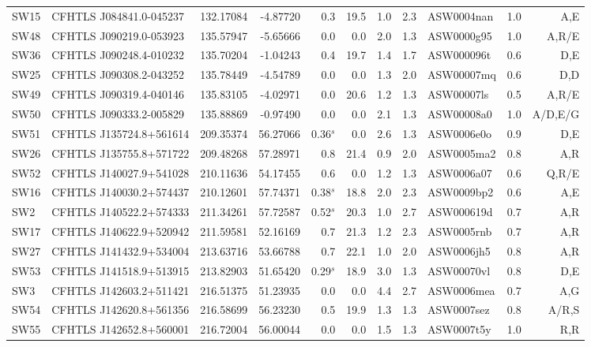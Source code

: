 \documentclass[useAMS,usenatbib,a4paper]{mn2e}
\begin{document}
\begin{center}
\begin{longtable}{llrrrrrrlrr}
SW15 & CFHTLS J084841.0-045237 & 132.17084 &  -4.87720 &  0.3 & 19.5 &  1.0 &  2.3 & ASW0004nan &  1.0 &  A,E   \\ 
SW48 & CFHTLS J090219.0-053923 & 135.57947 &  -5.65666 &  0.0 &  0.0 &  2.0 &  1.3 & ASW0000g95 &  1.0 &  A,R/E   \\ 
SW36 & CFHTLS J090248.4-010232 & 135.70204 &  -1.04243 &  0.4 & 19.7 &  1.4 &  1.7 & ASW000096t &  0.6 &  D,E   \\ 
SW25 & CFHTLS J090308.2-043252 & 135.78449 &  -4.54789 &  0.0 &  0.0 &  1.3 &  2.0 & ASW00007mq &  0.6 &  D,D   \\ 
SW49 & CFHTLS J090319.4-040146 & 135.83105 &  -4.02971 &  0.0 & 20.6 &  1.2 &  1.3 & ASW00007ls &  0.5 &  A,R/E   \\ 
SW50 & CFHTLS J090333.2-005829 & 135.88869 &  -0.97490 &  0.0 &  0.0 &  2.1 &  1.3 & ASW00008a0 &  1.0 &  A/D,E/G   \\ 
SW51 & CFHTLS J135724.8+561614 & 209.35374 &  56.27066 &  0.36$^s$ &  0.0 &  2.6 &  1.3 & ASW0006e0o &  0.9 &  D,E   \\ 
SW26 & CFHTLS J135755.8+571722 & 209.48268 &  57.28971 &  0.8 & 21.4 &  0.9 &  2.0 & ASW0005ma2 &  0.8 &  A,R   \\ 
SW52 & CFHTLS J140027.9+541028 & 210.11636 &  54.17455 &  0.6 &  0.0 &  1.2 &  1.3 & ASW0006a07 &  0.6 &  Q,R/E   \\ 
SW16 & CFHTLS J140030.2+574437 & 210.12601 &  57.74371 &  0.38$^s$ & 18.8 &  2.0 &  2.3 & ASW0009bp2 &  0.6 &  A,E   \\ 
SW2 & CFHTLS J140522.2+574333 & 211.34261 &  57.72587 &  0.52$^s$ & 20.3 &  1.0 &  2.7 & ASW000619d &  0.7 &  A,R   \\ 
SW17 & CFHTLS J140622.9+520942 & 211.59581 &  52.16169 &  0.7 & 21.3 &  1.2 &  2.3 & ASW0005rnb &  0.7 &  A,R   \\ 
SW27 & CFHTLS J141432.9+534004 & 213.63716 &  53.66788 &  0.7 & 22.1 &  1.0 &  2.0 & ASW0006jh5 &  0.8 &  A,R   \\ 
SW53 & CFHTLS J141518.9+513915 & 213.82903 &  51.65420 &  0.29$^s$ & 18.9 &  3.0 &  1.3 & ASW00070vl &  0.8 &  D,E   \\ 
SW3 & CFHTLS J142603.2+511421 & 216.51375 &  51.23935 &  0.0 &  0.0 &  4.4 &  2.7 & ASW0006mea &  0.7 &  A,G   \\ 
SW54 & CFHTLS J142620.8+561356 & 216.58699 &  56.23230 &  0.5 & 19.9 &  1.3 &  1.3 & ASW0007sez &  0.8 &  A/R,S   \\ 
SW55 & CFHTLS J142652.8+560001 & 216.72004 &  56.00044 &  0.0 &  0.0 &  1.5 &  1.3 & ASW0007t5y &  1.0 &  R,R   \\ 

\end{longtable}
\end{center}
\end{document}
